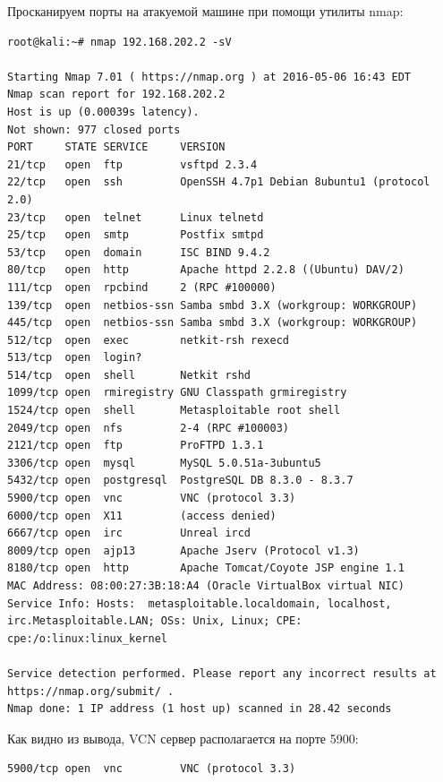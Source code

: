 \documentclass[10pt,a4paper]{report}
\begin{document}
		Просканируем порты на атакуемой машине при помощи утилиты nmap:
		\begin{lstlisting}
root@kali:~# nmap 192.168.202.2 -sV

Starting Nmap 7.01 ( https://nmap.org ) at 2016-05-06 16:43 EDT
Nmap scan report for 192.168.202.2
Host is up (0.00039s latency).
Not shown: 977 closed ports
PORT     STATE SERVICE     VERSION
21/tcp   open  ftp         vsftpd 2.3.4
22/tcp   open  ssh         OpenSSH 4.7p1 Debian 8ubuntu1 (protocol 2.0)
23/tcp   open  telnet      Linux telnetd
25/tcp   open  smtp        Postfix smtpd
53/tcp   open  domain      ISC BIND 9.4.2
80/tcp   open  http        Apache httpd 2.2.8 ((Ubuntu) DAV/2)
111/tcp  open  rpcbind     2 (RPC #100000)
139/tcp  open  netbios-ssn Samba smbd 3.X (workgroup: WORKGROUP)
445/tcp  open  netbios-ssn Samba smbd 3.X (workgroup: WORKGROUP)
512/tcp  open  exec        netkit-rsh rexecd
513/tcp  open  login?
514/tcp  open  shell       Netkit rshd
1099/tcp open  rmiregistry GNU Classpath grmiregistry
1524/tcp open  shell       Metasploitable root shell
2049/tcp open  nfs         2-4 (RPC #100003)
2121/tcp open  ftp         ProFTPD 1.3.1
3306/tcp open  mysql       MySQL 5.0.51a-3ubuntu5
5432/tcp open  postgresql  PostgreSQL DB 8.3.0 - 8.3.7
5900/tcp open  vnc         VNC (protocol 3.3)
6000/tcp open  X11         (access denied)
6667/tcp open  irc         Unreal ircd
8009/tcp open  ajp13       Apache Jserv (Protocol v1.3)
8180/tcp open  http        Apache Tomcat/Coyote JSP engine 1.1
MAC Address: 08:00:27:3B:18:A4 (Oracle VirtualBox virtual NIC)
Service Info: Hosts:  metasploitable.localdomain, localhost, 
irc.Metasploitable.LAN; OSs: Unix, Linux; CPE: cpe:/o:linux:linux_kernel

Service detection performed. Please report any incorrect results at 
https://nmap.org/submit/ .
Nmap done: 1 IP address (1 host up) scanned in 28.42 seconds
		\end{lstlisting}
		
		Как видно из вывода, VCN сервер располагается на порте 5900:
		\begin{lstlisting}
5900/tcp open  vnc         VNC (protocol 3.3)
		\end{lstlisting}
		
\end{document}
